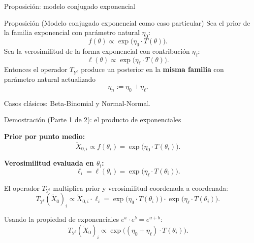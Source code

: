 \documentclass[12pt, aspectratio=169]{beamer}
\begin{document}
\begin{frame}{Proposición: modelo conjugado exponencial}

  \begin{alertblock}{Proposición (Modelo conjugado exponencial como caso particular)}
    Sea el prior de la familia exponencial con parámetro natural $\eta_0$:
    \[
      f(\theta) \propto \exp\bigl(\eta_0 \cdot T(\theta)\bigr).
    \]
    Sea la verosimilitud de la forma exponencial con contribución $\eta_\ell$:
    \[
      \ell(\theta) \propto \exp\bigl(\eta_\ell \cdot T(\theta)\bigr).
    \]
    Entonces el operador $T_{Y^\ell}$ produce un posterior en la \textbf{misma familia}
    con parámetro natural actualizado
    \[
      \boxed{\eta_n := \eta_0 + \eta_\ell.}
    \]
  \end{alertblock}

  \vspace{4pt}
  \small Casos clásicos: Beta-Binomial y Normal-Normal.
\end{frame}

\begin{frame}{Demostración (Parte 1 de 2): el producto de exponenciales}

  \textbf{Prior por punto medio:}
  \[
    \widetilde X_{0,i} \propto f(\theta_i)
    = \exp\bigl(\eta_0 \cdot T(\theta_i)\bigr).
  \]

  \textbf{Verosimilitud evaluada en $\theta_i$:}
  \[
    \ell_i = \ell(\theta_i) = \exp\bigl(\eta_\ell \cdot T(\theta_i)\bigr).
  \]

  \vspace{8pt}
  El operador $T_{Y^\ell}$ multiplica prior y verosimilitud coordenada a coordenada:
  \[
    T_{Y^\ell}(\widetilde X_0)_i
    \propto \widetilde X_{0,i} \cdot \ell_i
    = \exp\bigl(\eta_0 \cdot T(\theta_i)\bigr)
      \cdot \exp\bigl(\eta_\ell \cdot T(\theta_i)\bigr).
  \]

  \vspace{6pt}
  Usando la propiedad de exponenciales $e^a \cdot e^b = e^{a+b}$:
  \[
    T_{Y^\ell}(\widetilde X_0)_i
    \propto \exp\bigl((\eta_0 + \eta_\ell) \cdot T(\theta_i)\bigr).
  \]
\end{frame}
\end{document}
